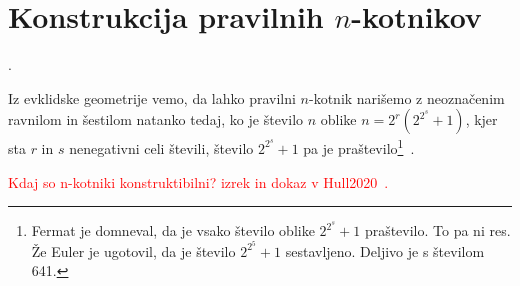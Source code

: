 \section{Konstrukcija pravilnih $n$-kotnikov}.

Iz evklidske geometrije vemo, da lahko pravilni $n$-kotnik narišemo z neoznačenim ravnilom in šestilom natanko tedaj, ko je število $n$ oblike $ n = 2^r(2^{2^s} + 1) $, kjer sta $r$ in $s$ nenegativni celi števili, število $2^{2^s} + 1$ pa je praštevilo\footnote{Fermat je domneval, da je vsako število oblike $2^{2^s} + 1$ praštevilo. To pa ni res. Že Euler je ugotovil, da je število $2^{2^5} + 1$ sestavljeno. Deljivo je s številom 641.}~\cite[str.\ 78]{jerman1998}.

\textcolor{red}{Kdaj so n-kotniki konstruktibilni? izrek in dokaz v Hull2020~\cite[str.\ 54]{hull2020}.}

